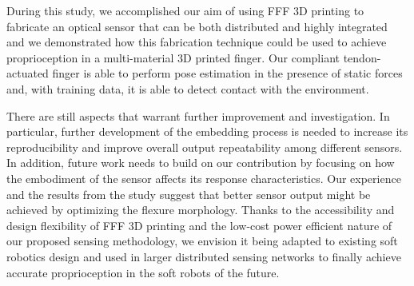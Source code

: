 During this study, we accomplished our aim of using FFF 3D printing to fabricate an optical sensor that can be both distributed and highly integrated and we demonstrated how this fabrication technique could be used to achieve proprioception in a multi-material 3D printed finger. Our compliant tendon-actuated finger is able to perform pose estimation in the presence of static forces and, with training data, it is able to detect contact with the environment.

There are still aspects that warrant further improvement and investigation. In particular, further development of the embedding process is needed to increase its reproducibility and improve overall output repeatability among different sensors. In addition, future work needs to build on our contribution by focusing on how the embodiment of the sensor affects its response characteristics. Our experience and the results from the study suggest that better sensor output might be achieved by optimizing the flexure morphology. Thanks to the accessibility and design flexibility of FFF 3D printing and the low-cost power efficient nature of our proposed sensing methodology, we envision it being adapted to existing soft robotics design and used in larger distributed sensing networks to finally achieve accurate proprioception in the soft robots of the future.